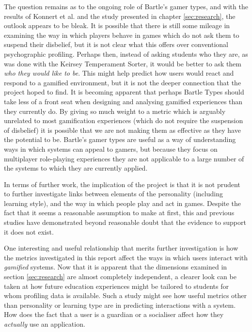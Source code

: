 \documentclass[12pt,a4paper,twoside]{report}
\begin{document}
The question remains as to the ongoing role of Bartle's gamer types, and with the results of Konnert et al. \cite{konertmodeling} and the study presented in chapter \ref{sec:research}, the outlook appears to be bleak. It is possible that there is still some mileage in examining the way in which players behave in games which do not ask them to suspend their disbelief, but it is not clear what this offers over conventional psychographic profiling. Perhaps then, instead of asking students who they are, as was done with the Keirsey Temperament Sorter, it would be better to ask them \textit{who they would like to be}. This might help predict how users would react and respond to a gamified environment, but it is not the deeper connection that the project hoped to find. It is becoming apparent that perhaps Bartle Types should take less of a front seat when designing and analysing gamified experiences than they currently do. By giving so much weight to a metric which is arguably unrelated to most gamification experiences (which do not require the suspension of disbelief) it is possible that we are not making them as effective as they have the potential to be. Bartle's gamer types are useful as a way of understanding ways in which systems can appeal to gamers, but because they focus on multiplayer role-playing experiences they are not applicable to a large number of the systems to which they are currently applied.

In terms of further work, the implication of the project is that it is not prudent to further investigate links between elements of the personality (including learning style), and the way in which people play and act in games. Despite the fact that it seems a reasonable assumption to make at first, this and previous studies have demonstrated beyond reasonable doubt that the evidence to support it does not exist.

One interesting and useful relationship that merits further investigation is how the metrics investigated in this report affect the ways in which users interact with \textit{gamified} systems. Now that it is apparent that the dimensions examined in section \ref{sec:research} are almost completely independent, a clearer look can be taken at how future education experiences might be tailored to students for whom profiling data is available. Such a study might see how useful metrics other than personality or learning type are in predicting interactions with a system. How does the fact that a user is a guardian or a socialiser affect how they \textit{actually} use an application.
\end{document}
